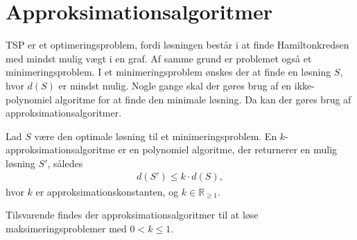 \section{Approksimationsalgoritmer}
TSP er et optimeringsproblem, fordi løsningen består i at finde Hamiltonkredsen med mindst mulig vægt i en graf. 
Af samme grund er problemet også et minimeringsproblem. 
I et minimeringsproblem ønskes der at finde en løsning $S$, hvor $d(S)$ er mindst mulig.
Nogle gange skal der gøres brug af en ikke-polynomiel algoritme for at finde den minimale løsning.
Da kan der gøres brug af approksimationsalgoritmer.

\begin{defn}\label{def:apk}
Lad $S$ være den optimale løsning til et minimeringsproblem. En $k$-approksimationsalgoritme er en polynomiel algoritme, der returnerer en mulig løsning $S'$, således
\begin{align*}
d(S') \leq k \cdot d(S),
\end{align*}
hvor $k$ er approksimationskonstanten, og $k \in \mathbb{R}_{\geq 1}$.
\end{defn}

Tilsvarende findes der approksimationsalgoritmer til at løse maksimeringsproblemer med $0 < k \leq 1$.
